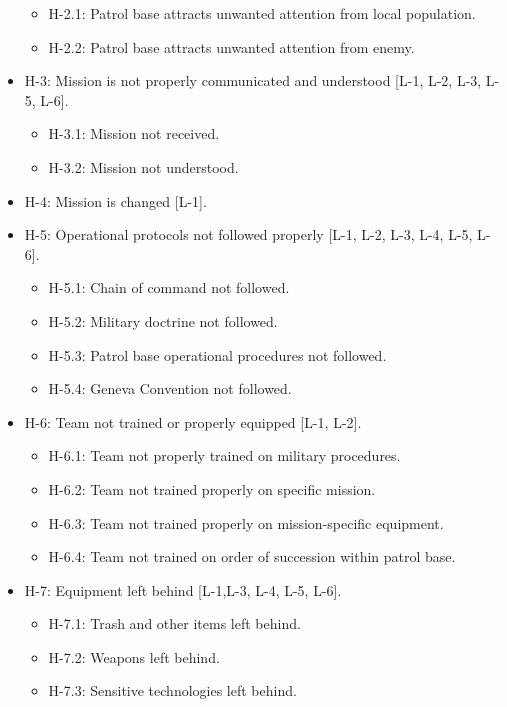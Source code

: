 \documentclass[../../main/main.tex]{subfiles}
\begin{document}
\begin{itemize}
\begin{itemize}
\item H-2.1: Patrol base attracts unwanted attention from local population.
\item H-2.2: Patrol base attracts unwanted attention from enemy.
\end{itemize}

\item H-3: Mission is not properly communicated and understood [L-1, L-2, L-3, L-5, L-6].\\
\begin{itemize}
\item H-3.1: Mission not received.
\item H-3.2: Mission not understood.
\end{itemize}


\item H-4: Mission is changed [L-1].\\

\item H-5: Operational protocols not followed properly [L-1, L-2, L-3, L-4, L-5, L-6].\\
\begin{itemize}
\item H-5.1: Chain of command not followed.
\item H-5.2: Military doctrine not followed.
\item H-5.3: Patrol base operational procedures not followed.
\item H-5.4: Geneva Convention not followed.
\end{itemize}

\item H-6: Team not trained or properly equipped [L-1, L-2].\\
\begin{itemize}
\item H-6.1: Team not properly trained on military procedures.
\item H-6.2: Team not trained properly on specific mission.
\item H-6.3: Team not trained properly on mission-specific equipment.
\item H-6.4: Team not trained on order of succession within patrol base.
\end{itemize}


\item H-7: Equipment left behind [L-1,L-3, L-4, L-5, L-6].\\
\begin{itemize}
\item H-7.1: Trash and other items left behind.
\item H-7.2: Weapons left behind.
\item H-7.3: Sensitive technologies left behind.
\end{itemize}


\end{itemize}
\end{document}
